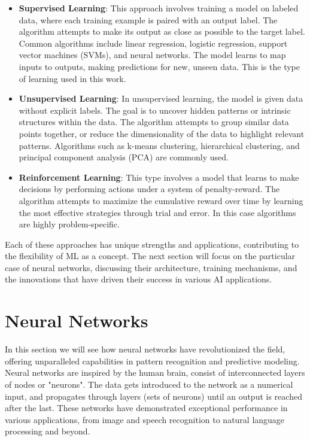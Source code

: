 \documentclass[a4paper, 11pt]{report}
\begin{document}
\begin{itemize}
\item \textbf{Supervised Learning}: This approach involves training a model on labeled data, where each training example is paired with an output label. The algorithm attempts to make its output as close as possible to the target label. Common algorithms include linear regression, logistic regression, support vector machines (SVMs), and neural networks. The model learns to map inputs to outputs, making predictions for new, unseen data. This is the type of learning used in this work.

\item \textbf{Unsupervised Learning}: In unsupervised learning, the model is given data without explicit labels. The goal is to uncover hidden patterns or intrinsic structures within the data. The algorithm attempts to group similar data points together, or reduce the dimensionality of the data to highlight relevant patterns. Algorithms such as k-means clustering, hierarchical clustering, and principal component analysis (PCA) are commonly used.

\item \textbf{Reinforcement Learning}: This type involves a model that learns to make decisions by performing actions under a system of penalty-reward.  The algorithm attempts to maximize the cumulative reward over time by learning the most effective strategies through trial and error. In this case algorithms are highly problem-specific.
\end{itemize}

Each of these approaches has unique strengths and applications, contributing to the flexibility of ML as a concept.  The next section will focus on the particular case of neural networks, discussing their architecture, training mechanisms, and the innovations that have driven their success in various AI applications.

\section{Neural Networks}\label{Theory: NN}
In this section we will see how neural networks have revolutionized the field, offering unparalleled capabilities in pattern recognition and predictive modeling. Neural networks are inspired by the human brain, consist of interconnected layers of nodes or "neurons". The data gets introduced to the network as a numerical input, and propagates through layers (sets of neurons) until an output is reached after the last. These networks have demonstrated exceptional performance in various applications, from image and speech recognition to natural language processing and beyond.
\end{document}
